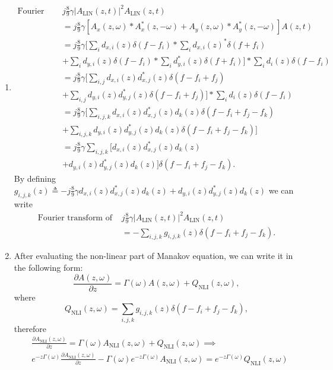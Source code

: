 \documentclass[10pt,letterpaper]{article}
\begin{document}
\begin{enumerate}[label=\alph*-]
\item
\[\begin{split}
\text{Fourier transform of }
&
j\frac{8}{9}\gamma |A_\text{LIN}(z,t)|^2A_\text{LIN}(z,t)
\\&=
j\frac{8}{9}\gamma
\left[A_x(z,\omega)*A_x^*(z,-\omega)+A_y(z,\omega)*A_y^*(z,-\omega)\right]A(z,t)
\\&=
j\frac{8}{9}\gamma
\big[\sum_i d_{x,i}(z)\delta(f-f_i)*\sum_i d_{x,i}(z)^*\delta(f+f_i)
\\&+\sum_i d_{y,i}(z)\delta(f-f_i)*\sum_i d_{y,i}^*(z)\delta(f+f_i)\big]*\sum_i d_i(z)\delta(f-f_i)
\\&=
j\frac{8}{9}\gamma
\big[
\sum_{i,j} d_{x,i}(z)d^*_{x,j}(z)\delta(f-f_i+f_j)
\\&+
\sum_{i,j} d_{y,i}(z)d^*_{y,j}(z)\delta(f-f_i+f_j)
\big]*\sum_i d_i(z)\delta(f-f_i)
\\&=
j\frac{8}{9}\gamma
\big[
\sum_{i,j,k} d_{x,i}(z)d^*_{x,j}(z)d_k(z)\delta(f-f_i+f_j-f_k)
\\&+
\sum_{i,j,k} d_{y,i}(z)d^*_{y,j}(z)d_k(z)\delta(f-f_i+f_j-f_k)
\big]
\\&=
j\frac{8}{9}\gamma
\sum_{i,j,k} \big[d_{x,i}(z)d^*_{x,j}(z)d_k(z)
\\&+
d_{y,i}(z)d^*_{y,j}(z)d_k(z)\big]\delta(f-f_i+f_j-f_k).
\end{split}\]
By defining 
$
g_{i,j,k}(z)\triangleq
-j\frac{8}{9}\gamma
d_{x,i}(z)d^*_{x,j}(z)d_k(z)
+
d_{y,i}(z)d^*_{y,j}(z)d_k(z)
$
we can write
\[\begin{split}
\text{Fourier transform of }
&
j\frac{8}{9}\gamma |A_\text{LIN}(z,t)|^2A_\text{LIN}(z,t)
\\&=
-
\sum_{i,j,k} g_{i,j,k}(z)\delta(f-f_i+f_j-f_k).
\end{split}\]
\item
After evaluating the non-linear part of Manakov equation, we can write it in the following form:
$$
\frac{\partial A(z,\omega)}{\partial z}
=
\Gamma(\omega) A(z,\omega)
+Q_\text{NLI}(z,\omega),
$$
where
$$
Q_\text{NLI}(z,\omega)=
\sum_{i,j,k} g_{i,j,k}(z)\delta(f-f_i+f_j-f_k)
,
$$
therefore
\[\begin{split}
&
\frac{\partial A_\text{NLI}(z,\omega)}{\partial z}
=
\Gamma(\omega) A_\text{NLI}(z,\omega)
+Q_\text{NLI}(z,\omega)
\implies\\&
e^{-z\Gamma(\omega)}\frac{\partial A_\text{NLI}(z,\omega)}{\partial z}
-
\Gamma(\omega)e^{-z\Gamma(\omega)} A_\text{NLI}(z,\omega)
=e^{-z\Gamma(\omega)}Q_\text{NLI}(z,\omega)

\end{split}\]
\end{enumerate}
\end{document}
